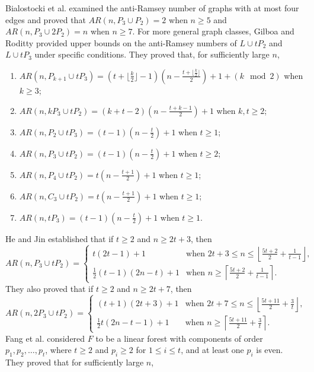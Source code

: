 \documentclass[12pt]{article}
\begin{document}
Bialostocki et al. \cite{p1-1} examined the anti-Ramsey number of graphs with at most four edges and proved that \( AR(n,P_3 \cup P_2) = 2 \) when \( n \geq 5 \) and \( AR(n,P_3 \cup 2P_2) = n \) when \( n \geq 7 \).
For more general graph classes, Gilboa and Roditty \cite{p1-6} provided upper bounds on the anti-Ramsey numbers of \( L \cup tP_2 \) and \( L \cup tP_3 \) under specific conditions. They proved that, for sufficiently large \( n \),
\begin{enumerate}
 \item[$\bullet$] $AR(n,P_{k+1}\cup tP_3)=(t+\lfloor\frac{k}{2}\rfloor-1)(n-\frac{t+\lfloor\frac{k}{2}\rfloor}{2})+1+(k \mod 2)$ when $k\geq3$;
 \item[$\bullet$] $AR(n,kP_3\cup tP_2)=(k+t-2)(n-\frac{t+k-1}{2})+1$ when $k,t\geq2$;
 \item[$\bullet$] $AR(n,P_2\cup tP_3)=(t-1)(n-\frac{t}{2})+1$ when $t\geq1$;
  \item[$\bullet$] $AR(n,P_3\cup tP_2)=(t-1)(n-\frac{t}{2})+1$ when $t\geq2$;
  \item[$\bullet$] $AR(n,P_4\cup tP_2)=t(n-\frac{t+1}{2})+1$ when $t\geq1$;
   \item[$\bullet$] $AR(n,C_3\cup tP_2)=t(n-\frac{t+1}{2})+1$ when $t\geq1$;
 \item[$\bullet$] $AR(n, tP_3)=(t-1)(n-\frac{t}{2})+1$ when $t\geq1$.
  \end{enumerate}
He and Jin \cite{p1-8} established that if \( t \geq 2 \) and \( n \geq 2t + 3 \), then 
\[
AR(n, P_3 \cup tP_2) = 
\begin{cases} 
t(2t-1) + 1 & \text{when } 2t + 3 \leq n \leq \left\lfloor \frac{5t + 2}{2} + \frac{1}{t-1} \right\rfloor, \\
\frac{1}{2} (t-1)(2n - t) + 1 & \text{when } n \geq \left\lceil \frac{5t + 2}{2} + \frac{1}{t-1} \right\rceil. 
\end{cases}
\]
They also proved that if \( t \geq 2 \) and \( n \geq 2t + 7 \), then 
\[
AR(n, 2P_3 \cup tP_2) = 
\begin{cases} 
(t+1)(2t + 3) + 1 & \text{when } 2t + 7 \leq n \leq \left\lfloor \frac{5t + 11}{2} + \frac{3}{t} \right\rfloor, \\
\frac{1}{2} t(2n - t - 1) + 1 & \text{when } n \geq \left\lceil \frac{5t + 11}{2} + \frac{3}{t} \right\rceil. 
\end{cases}
\]
Fang et al. \cite{p1-4} considered \( F \) to be a linear forest with components of order \( p_1, p_2, \ldots, p_t \), where \( t \geq 2 \) and \( p_i \geq 2 \) for \( 1 \leq i \leq t \), and at least one \( p_i \) is even. They proved that for sufficiently large \( n \), 
\end{document}
